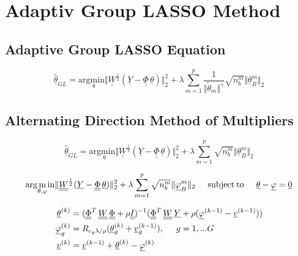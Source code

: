 \section{Adaptiv Group LASSO Method}
\label{sec:Adaptive_Group_LASSO}

\subsection{Adaptive Group LASSO Equation}
\label{sec:Adaptive_GroupLassoEq}

 \begin{equation}
	\hat{\underline{\theta}}_{GL} = \mathrm{arg \underset{\theta} min} \Vert \underline{\underline{W}}^{\frac{1}{2}} (\underline{Y}-\underline{\underline{\Phi}} \, \underline{\theta}) \Vert^2_2 + \lambda \sum_{m=1}^p \dfrac{1}{\Vert \tilde{\theta}_m \Vert^\gamma} \sqrt{n^m_b} \Vert \underline{\theta}^m_B \Vert_2
	\label{eq:adaptive_grouplasso}
\end{equation}


\subsection{Alternating Direction Method of Multipliers}
\label{sec:ADMM}




 \begin{equation}
	\hat{\underline{\theta}}_{GL} = \mathrm{arg \underset{\theta} min} \Vert \underline{\underline{W}}^{\frac{1}{2}} (\underline{Y}-\underline{\underline{\Phi}} \, \underline{\theta}) \Vert^2_2 + \lambda \sum_{m=1}^p \sqrt{n^m_b} \Vert \underline{\theta}^m_B \Vert_2
	\label{eq:admm_gl}
\end{equation}


 \begin{equation}
	\mathrm{arg \underset{\theta, \varphi} min} \Vert \underline{\underline{W}}^{\frac{1}{2}} (\underline{Y}-\underline{\underline{\Phi}} \, \underline{\theta}) \Vert^2_2 + \lambda \sum_{m=1}^p \sqrt{n^m_b} \Vert \underline{\varphi}^m_B \Vert_2 \hspace{0.5cm} \mathrm{subject \: to} \hspace{0.5cm} \underline{\theta} - \underline{\varphi} = \underline{0}
	\label{eq:admm_extended}
\end{equation}




\begin{align}
	\underline{\theta}^{(k)} &= (\underline{\underline{\Phi}}^T \, \underline{\underline{W}} \, \underline{\underline{\Phi}} + \rho \underline{\underline{I}})^{-1}(\underline{\underline{\Phi}}^T \, \underline{\underline{W}} \, \underline{Y} + \rho (\underline{\varphi}^{(k-1)}-\underline{v}^{(k-1)})) \label{eq:eq1} \\ 
	\underline{\varphi}^{(k)}_g &= R_{c_g \lambda/ \rho}(\underline{\theta}_g^{(k)}+\underline{v}_g^{(k-1)}), \hspace{0.5cm} g= 1,...G  \label{eq:eq2} \\ 
	\underline{v}^{(k)} &= \underline{v}^{(k-1)}+ \underline{\theta}^{(k)}-\underline{\varphi}^{(k)}
	\label{eq:eq3}
\end{align}


